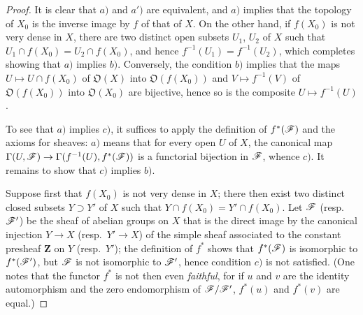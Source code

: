 \begin{proof}
It is clear that $a)$ and $a')$ are equivalent, and $a)$ implies that the topology of $X_0$ is the inverse image by $f$ of that of $X$.
On the other hand, if $f(X_0)$ is not very dense in $X$, there are two distinct open subsets $U_1$, $U_2$ of $X$ such that $U_1\cap f(X_0)=U_2\cap f(X_0)$, and hence $f^{-1}(U_1)=f^{-1}(U_2)$, which completes showing that $a)$ implies $b)$.
Conversely, the condition $b)$ implies that the maps $U\mapsto U\cap f(X_0)$ of $\mathfrak{O}(X)$ into $\mathfrak{O}(f(X_0))$ and $V\mapsto f^{-1}(V)$ of $\mathfrak{O}(f(X_0))$ into $\mathfrak{O}(X_0)$ are bijective, hence so is the composite $U\mapsto f^{-1}(U)$.

To see that $a)$ implies $c)$, it suffices to apply the definition of $f^*(\mathscr{F})$  and the axioms for sheaves: $a)$ means that for every open $U$ of $X$, the canonical map $\Gamma(U,\mathscr{F})\to\Gamma(f^{-1}(U),f^*(\mathscr{F}))$ is a functorial bijection in $\mathscr{F}$, whence $c)$.
It remains to show that $c)$ implies $b)$.

Suppose first that $f(X_0)$ is not very dense in $X$; there then exist two distinct closed subsets $Y\supset Y'$ of $X$ such that $Y\cap f(X_0)=Y'\cap f(X_0)$.
Let $\mathscr{F}$ (resp.\ $\mathscr{F}'$) be the sheaf of abelian groups on $X$ that is the direct image by the canonical injection $Y\to X$ (resp.\ $Y'\to X$) of the simple sheaf associated to the constant presheaf $\mathbf{Z}$ on $Y$ (resp.\ $Y'$); the definition of $f^*$  shows that $f^*(\mathscr{F})$ is isomorphic to $f^*(\mathscr{F}')$, but $\mathscr{F}$ is not isomorphic to $\mathscr{F}'$, hence condition $c)$ is not satisfied.
(One notes that the functor $f^*$ is not then even \emph{faithful}, for if $u$ and $v$ are the identity automorphism and the zero endomorphism of $\mathscr{F}/\mathscr{F}'$, $f^*(u)$ and $f^*(v)$ are equal.)


\end{proof}
